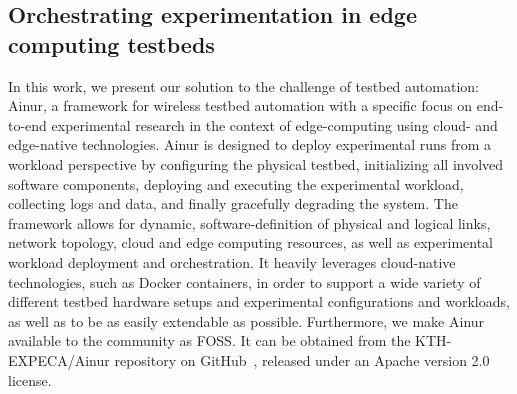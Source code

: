 \FloatBarrier%

\subsection{Orchestrating experimentation in edge computing testbeds}


In this work, we present our solution to the challenge of testbed automation: Ainur, a framework for wireless testbed automation with a specific focus on end-to-end experimental research in the context of edge-computing using cloud- and edge-native technologies.
Ainur is designed to deploy experimental runs from a workload perspective by configuring the physical testbed, initializing all involved software components, deploying and executing the experimental workload, collecting logs and data, and finally gracefully degrading the system.
The framework allows for dynamic, software-definition of physical and logical links, network topology, cloud and edge computing resources, as well as experimental workload deployment and orchestration.
It heavily leverages cloud-native technologies, such as Docker containers, in order to support a wide variety of different testbed hardware setups and experimental configurations and workloads, as well as to be as easily extendable as possible.
Furthermore, we make Ainur available to the community as \ac{FOSS}.
It can be obtained from the {KTH-EXPECA/Ainur} repository on GitHub~\cite{ainur:github}, released under an Apache version \num{2.0} license.

